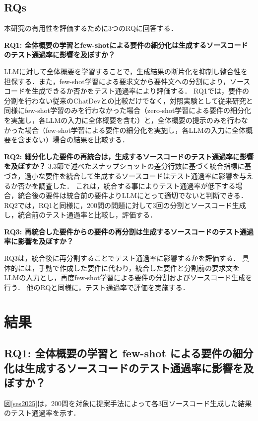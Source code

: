 \documentclass[submit,techrep,noauthor]{ipsj}
\begin{document}
\subsection{RQs}
本研究の有用性を評価するために3つのRQに回答する．

\noindent\textbf{RQ1: 全体概要の学習とfew-shotによる要件の細分化は生成するソースコードのテスト通過率に影響を及ぼすか？}

LLMに対して全体概要を学習することで，生成結果の断片化を抑制し整合性を担保する．また，few-shot学習による要求文から要件文への分割により，ソースコードを生成できるか否かをテスト通過率により評価する．
RQ1では，要件の分割を行わない従来のChatDevとの比較だけでなく，対照実験として従来研究\cite{tosem}と同様にfew-shot学習のみを行わなかった場合（zero-shot学習による要件の細分化を実施し，各LLMの入力に全体概要を含む）と，全体概要の提示のみを行わなかった場合（few-shot学習による要件の細分化を実施し，各LLMの入力に全体概要を含まない）場合の結果を比較する．

\noindent\textbf{RQ2: 細分化した要件の再統合は，生成するソースコードのテスト通過率に影響を及ぼすか？}
3.3節で述べたスナップショットの差分行数に基づく統合指標に基づき，過小な要件を統合して生成するソースコードはテスト通過率に影響を与えるか否かを調査した．
これは，統合する事によりテスト通過率が低下する場合，統合後の要件は統合前の要件よりLLMにとって適切でないと判断できる．
RQ2では，RQ1と同様に，200問の問題に対して3回の分割とソースコード生成し，統合前のテスト通過率と比較し，評価する．


\noindent\textbf{RQ3: 再統合した要件からの要件の再分割は生成するソースコードのテスト通過率に影響を及ぼすか？}

RQ3は，統合後に再分割することでテスト通過率に影響するかを評価する．
具体的には，手動で作成した要件に代わり，統合した要件と分割前の要求文をLLMの入力とし，再度few-shot学習による要件の分割およびソースコード生成を行う．
他のRQと同様に，テスト通過率で評価を実施する．

\section{結果}
\label{sec:result}

\subsection{RQ1: 全体概要の学習と few-shot による要件の細分化は生成するソースコードのテスト通過率に影響を及ぼすか？}
図\ref{ses2025}は，200問を対象に提案手法によって各3回ソースコード生成した結果のテスト通過率を示す．
\end{document}
